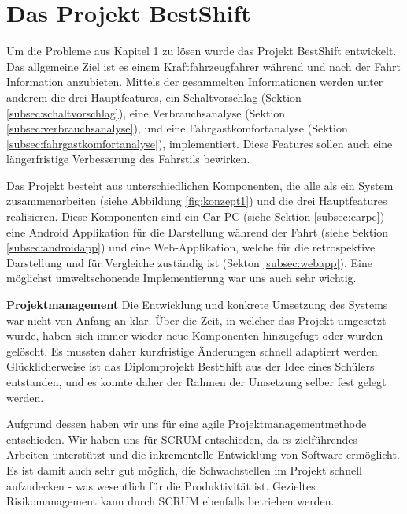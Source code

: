 \section{Das Projekt BestShift}
\label{sec:projektbestshift}

Um die Probleme aus Kapitel 1 zu lösen wurde das Projekt BestShift entwickelt. Das allgemeine Ziel ist es einem Kraftfahrzeugfahrer während und nach der Fahrt Information anzubieten. Mittels der gesammelten Informationen werden unter anderem die drei Hauptfeatures, ein Schaltvorschlag (Sektion \ref{subsec:schaltvorschlag}), eine Verbrauchsanalyse (Sektion \ref{subsec:verbrauchsanalyse}), und eine Fahrgastkomfortanalyse (Sektion \ref{subsec:fahrgastkomfortanalyse}), implementiert. Diese Features sollen auch eine längerfristige Verbesserung des Fahrstils bewirken.

Das Projekt besteht aus unterschiedlichen Komponenten, die alle als ein System zusammenarbeiten (siehe Abbildung \ref{fig:konzept1}) und die drei Hauptfeatures realisieren. Diese Komponenten sind ein Car-PC (siehe Sektion \ref{subsec:carpc}) eine Android Applikation für die Darstellung während der Fahrt (siehe Sektion \ref{subsec:androidapp}) und eine Web-Applikation, welche für die retrospektive Darstellung und für Vergleiche zuständig ist (Sekton \ref{subsec:webapp}). Eine möglichst umweltschonende Implementierung war uns auch sehr wichtig.

\textbf{Projektmanagement\newline}
Die Entwicklung und konkrete Umsetzung des Systems war nicht von Anfang an klar. Über die Zeit, in welcher das Projekt umgesetzt wurde, haben sich immer wieder neue Komponenten hinzugefügt oder wurden gelöscht. Es mussten daher kurzfristige Änderungen schnell adaptiert werden. Glücklicherweise ist das Diplomprojekt BestShift aus der Idee eines Schülers entstanden, und es konnte daher der Rahmen der Umsetzung selber fest gelegt werden.

Aufgrund dessen haben wir uns für eine agile Projektmanagementmethode entschieden. Wir haben uns für SCRUM entschieden, da es zielführendes Arbeiten unterstützt und die inkrementelle Entwicklung von Software ermöglicht. Es ist damit auch sehr gut möglich, die Schwachstellen im Projekt schnell aufzudecken - was wesentlich für die Produktivität ist. Gezieltes Risikomanagement kann durch SCRUM ebenfalls betrieben werden. 

